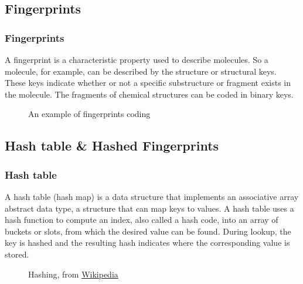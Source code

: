 \documentclass{beamer}
\begin{document}
\subsection{Fingerprints}
\begin{frame}
\frametitle{Fingerprints}
A fingerprint is a characteristic property used to describe molecules. So a molecule, for example, can be described by the structure or structural keys. These keys indicate whether or not a specific substructure or fragment exists in the molecule. The fragments of chemical structures can be coded in binary keys.
\begin{figure}[h!]
\caption{An example of fingerprints coding \cite{gasteiger2006chemoinformatics}}
\end{figure}
\end{frame}



\subsection{Hash table & Hashed Fingerprints}
\begin{frame}
\frametitle{Hash table}
A hash table (hash map) is a data structure that implements an associative array abstract data type, a structure that can map keys to values. A hash table uses a hash function to compute an index, also called a hash code, into an array of buckets or slots, from which the desired value can be found. During lookup, the key is hashed and the resulting hash indicates where the corresponding value is stored. 

\begin{figure}[h!]
\caption{Hashing, from \href{https://en.wikipedia.org/wiki/Hash_table}{Wikipedia} \cite{gasteiger2006chemoinformatics}}
\end{figure}
\end{frame}
\end{document}
